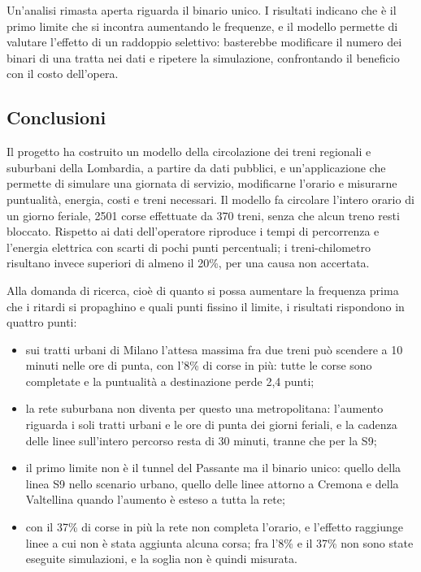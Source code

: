 Un'analisi rimasta aperta riguarda il binario unico. I risultati indicano che è il primo limite che si incontra aumentando le frequenze, e il modello permette di valutare l'effetto di un raddoppio selettivo: basterebbe modificare il numero dei binari di una tratta nei dati e ripetere la simulazione, confrontando il beneficio con il costo dell'opera.

\subsection{Conclusioni}
Il progetto ha costruito un modello della circolazione dei treni regionali e suburbani della Lombardia, a partire da dati pubblici, e un'applicazione che permette di simulare una giornata di servizio, modificarne l'orario e misurarne puntualità, energia, costi e treni necessari. Il modello fa circolare l'intero orario di un giorno feriale, 2501 corse effettuate da 370 treni, senza che alcun treno resti bloccato. Rispetto ai dati dell'operatore riproduce i tempi di percorrenza e l'energia elettrica con scarti di pochi punti percentuali; i treni-chilometro risultano invece superiori di almeno il 20\%, per una causa non accertata.

Alla domanda di ricerca, cioè di quanto si possa aumentare la frequenza prima che i ritardi si propaghino e quali punti fissino il limite, i risultati rispondono in quattro punti:
\begin{itemize}
	\item sui tratti urbani di Milano l'attesa massima fra due treni può scendere a 10 minuti nelle ore di punta, con l'8\% di corse in più: tutte le corse sono completate e la puntualità a destinazione perde 2,4 punti;
	\item la rete suburbana non diventa per questo una metropolitana: l'aumento riguarda i soli tratti urbani e le ore di punta dei giorni feriali, e la cadenza delle linee sull'intero percorso resta di 30 minuti, tranne che per la S9;
	\item il primo limite non è il tunnel del Passante ma il binario unico: quello della linea S9 nello scenario urbano, quello delle linee attorno a Cremona e della Valtellina quando l'aumento è esteso a tutta la rete;
	\item con il 37\% di corse in più la rete non completa l'orario, e l'effetto raggiunge linee a cui non è stata aggiunta alcuna corsa; fra l'8\% e il 37\% non sono state eseguite simulazioni, e la soglia non è quindi misurata.
\end{itemize}

